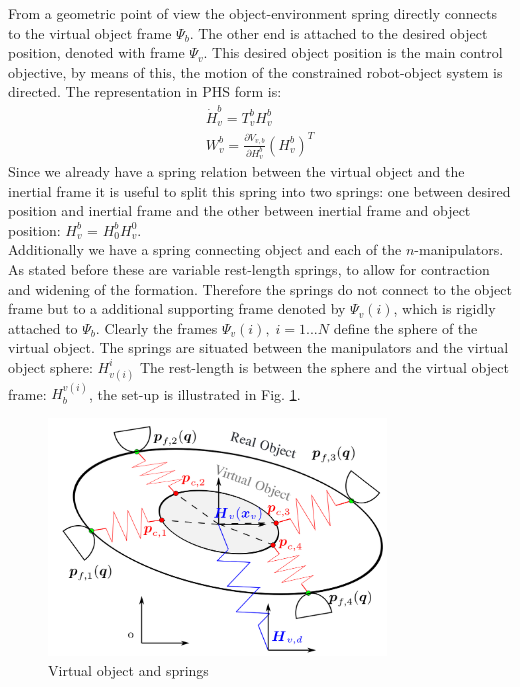 \documentclass[a4paper,twoside, openright,12pt]{report}
\begin{document}
From a geometric point of view the object-environment spring directly connects to the virtual object frame $\Psi_b$. The other end is attached to the desired object position, denoted with frame $\Psi_v$. This desired object position is the main control objective, by means of this, the motion of the constrained robot-object system is directed. The representation in PHS form is:
\begin{eqnarray}
	\dot{H}_v^b = T_v^{b}H_v^b\\
	W_v^{b} = \frac{\partial V_{v,b}}{\partial H_v^b}(H_v^b)^T
\end{eqnarray}
Since we already have a spring relation between the virtual object and the inertial frame it is useful to split this spring into two springs: one between desired position and inertial frame and the other between inertial frame and object position: $H_v^b$ = $H_0^b H_v^0 $.\\
Additionally we have a spring connecting object and each of the $n$-manipulators. As stated before these are variable rest-length springs, to allow for contraction and widening of the formation. Therefore the springs do not connect to the object frame but to a additional supporting frame denoted by $\Psi_v(i)$, which is rigidly attached to $\Psi_b$. Clearly the frames $\Psi_v(i),\; i=1...N$ define the sphere of the virtual object. The springs are situated between the manipulators and the virtual object sphere: $H_{v(i)}^i$ The rest-length is between the sphere and the virtual object frame: $H_b^{v(i)}$, the set-up is illustrated in Fig. \ref{FIG:IPCobject}.
\begin{figure}
	\centering
		\includegraphics[width=0.8\textwidth]{IPCobjects.png}
		\caption[Virtual object and springs]{Virtual object and springs \cite{Wimboeck_08}}
		\label{FIG:IPCobject}
\end{figure}
\end{document}
